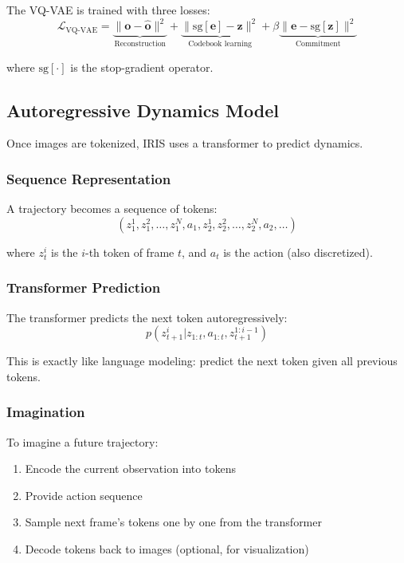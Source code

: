 The VQ-VAE is trained with three losses:
\begin{equation}
\mathcal{L}_{\text{VQ-VAE}} = \underbrace{\| \mathbf{o} - \hat{\mathbf{o}} \|^2}_{\text{Reconstruction}} + \underbrace{\| \text{sg}[\mathbf{e}] - \mathbf{z} \|^2}_{\text{Codebook learning}} + \beta \underbrace{\| \mathbf{e} - \text{sg}[\mathbf{z}] \|^2}_{\text{Commitment}}
\end{equation}

where $\text{sg}[\cdot]$ is the stop-gradient operator.

\subsection{Autoregressive Dynamics Model}

Once images are tokenized, IRIS uses a transformer to predict dynamics.

\subsubsection{Sequence Representation}

A trajectory becomes a sequence of tokens:
\begin{equation}
(z_1^1, z_1^2, \ldots, z_1^{N}, a_1, z_2^1, z_2^2, \ldots, z_2^{N}, a_2, \ldots)
\end{equation}

where $z_t^i$ is the $i$-th token of frame $t$, and $a_t$ is the action (also discretized).

\subsubsection{Transformer Prediction}

The transformer predicts the next token autoregressively:
\begin{equation}
p(z_{t+1}^i | z_{1:t}, a_{1:t}, z_{t+1}^{1:i-1})
\end{equation}

This is exactly like language modeling: predict the next token given all previous tokens.

\subsubsection{Imagination}

To imagine a future trajectory:
\begin{enumerate}
    \item Encode the current observation into tokens
    \item Provide action sequence
    \item Sample next frame's tokens one by one from the transformer
    \item Decode tokens back to images (optional, for visualization)
\end{enumerate}

